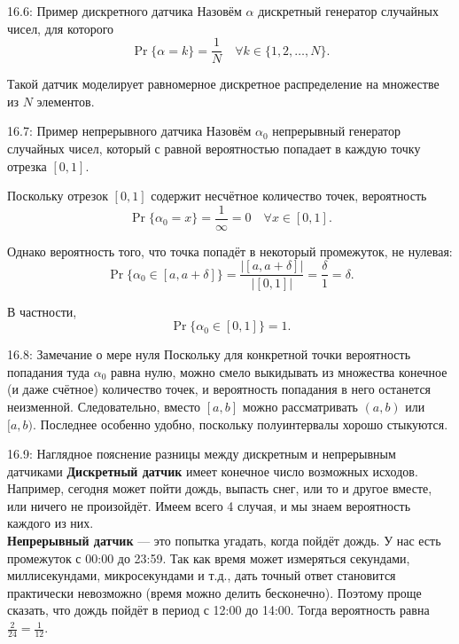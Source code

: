\documentclass[a4paper,12pt]{article}
\begin{document}
	\begin{examplebox}{16.6: Пример дискретного датчика}
		Назовём \(\alpha\) дискретный генератор случайных чисел, для которого
		\[ \Pr\{\alpha = k\} = \frac{1}{N} \quad \forall k \in \{1, 2, \dots, N\}. \]
		
		Такой датчик моделирует равномерное дискретное распределение на множестве из \(N\) элементов.
	\end{examplebox}
	
	\begin{examplebox}{16.7: Пример непрерывного датчика}
		Назовём \(\alpha_0\) непрерывный генератор случайных чисел, который с равной вероятностью попадает в каждую точку отрезка \([0, 1]\).
		
		Поскольку отрезок \([0, 1]\) содержит несчётное количество точек, вероятность
		\[ \Pr\{\alpha_0 = x\} = \frac{1}{\infty} = 0 \quad \forall x \in [0, 1]. \]
		
		Однако вероятность того, что точка попадёт в некоторый промежуток, не нулевая:
		\[ \Pr\{\alpha_0 \in [a, a+\delta]\} = \frac{|[a, a+\delta]|}{|[0,1]|} = \frac{\delta}{1} = \delta. \]
		
		В частности,
		\[ \Pr\{\alpha_0 \in [0, 1]\} = 1. \]
	\end{examplebox}
	
	\begin{remarkbox}{16.8: Замечание о мере нуля}
		Поскольку для конкретной точки вероятность попадания туда \(\alpha_0\) равна нулю, можно смело выкидывать из множества конечное (и даже счётное) количество точек, и вероятность попадания в него останется неизменной. Следовательно, вместо \([a, b]\) можно рассматривать \((a, b)\) или \([a, b)\). Последнее особенно удобно, поскольку полуинтервалы хорошо стыкуются.
	\end{remarkbox}
	
	\begin{notebook}{16.9: Наглядное пояснение разницы между дискретным и непрерывным датчиками}
		\textbf{Дискретный датчик} имеет конечное число возможных исходов. Например, сегодня может пойти дождь, выпасть снег, или то и другое вместе, или ничего не произойдёт. Имеем всего 4 случая, и мы знаем вероятность каждого из них. \\
		
		\textbf{Непрерывный датчик} — это попытка угадать, когда пойдёт дождь. У нас есть промежуток с 00:00 до 23:59. Так как время может измеряться секундами, миллисекундами, микросекундами и т.д., дать точный ответ становится практически невозможно (время можно делить бесконечно). Поэтому проще сказать, что дождь пойдёт в период с 12:00 до 14:00. Тогда вероятность равна \(\frac{2}{24} = \frac{1}{12}\).
	\end{notebook}
	
\end{document}
